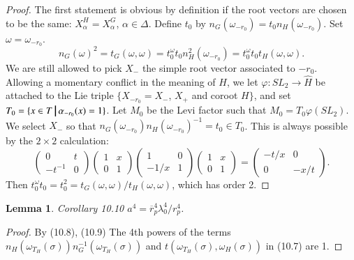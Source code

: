 \documentclass[11pt]{amsart}
\theoremstyle{plain}
\newtheorem{lemma}[theorem]{Lemma}
\theoremstyle{definition}
\def\suchthat{\ {\vrule width1truept height.3truecm depth.1truecm}\ }
\def\what#1{\widehat#1}
\begin{document}
\begin{proof}  The first statement is obvious by definition
if the root vectors are chosen to be the same: 
$X_\alpha^H=X_\alpha^G$, $\alpha\in\Delta$.  Define $t_0$ by 
$n_G(\omega_{-r_0}) = t_0n_H(\omega_{-r_0})$.  Set
$\omega = \omega_{-r_0}$.
$$
n_G(\omega)^2 = t_G(\omega,\omega) =
t_0^\omega t_0n_H^2(\omega_{-r_0})
= t_0^\omega t_0t_H(\omega,\omega).
$$                                                      
We are still allowed to pick $X_-$ the simple root 
vector associated to $-r_0$.
Allowing a momentary conflict in the meaning of $H$, we
let $\varphi:SL_2\to \what H$ be attached to the Lie triple 
$\{X_{-r_0}=X_-$, $X_+$ and coroot $H\}$, and set  
$T_0 = 
\{x\in T\suchthat \alpha_{-r_0}(x) = 1\}$.
Let $M_0$ be the Levi factor such that
$M_0 =T_0\varphi(SL_2)$.
We select $X_-$ so that
$n_G(\omega_{-r_0})n_H(\omega_{-r_0})^{-1} = 
t_0 \in T_0$.  This is always possible by the 
$2\times2$ calculation:
$$
\begin{pmatrix} 0&t\\-t^{-1}&0\end{pmatrix}
\begin{pmatrix} 1&x\\0&1\end{pmatrix}
\begin{pmatrix} 1&0\\-1/x&1\end{pmatrix}
\begin{pmatrix} 1&x\\0&1\end{pmatrix}
=\begin{pmatrix} -t/x&0\\0&-x/t\end{pmatrix}.
$$
Then $t_0^\omega t_0 = t_0^2 = t_G(\omega,\omega)/t_H(\omega,\omega)$, which
has order 2.
\end{proof}

\begin{lemma}{Corollary 10.10}  $a^4= \overline r_p^4 \lambda_0^4/r_p^4$.
\end{lemma}

\begin{proof}  By (10.8), (10.9) The 4th powers of the terms 
$n_H(\omega_{T_H}(\sigma))n_G^{-1}(\omega_{T_H}(\sigma))$
and $t(\omega_{T_H}(\sigma),\omega_H(\sigma))$ in (10.7) are 1.
\end{proof}
\end{document}
